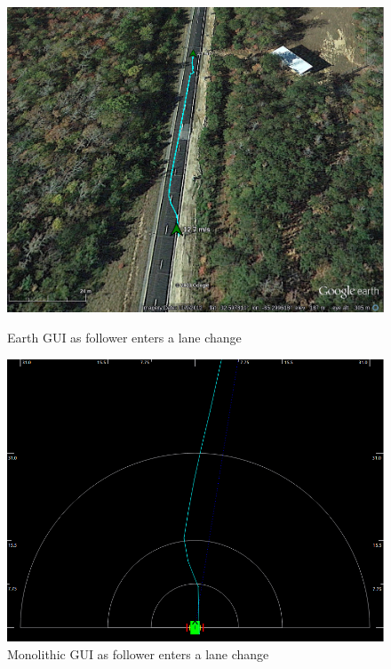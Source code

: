 \begin{figure}[ht] \centering
    \begin{minipage}[b]{0.45\linewidth} \centering 
        \includegraphics[width=\textwidth]{./figs/lane_change.png}
        \caption{Earth GUI as follower enters a lane change} \label{fig:lanechange_earth}
    \end{minipage}
    \hspace{0.5cm}
    \begin{minipage}[b]{0.45\linewidth} \centering
        \includegraphics[width=\textwidth]{./figs/lane_change_mono.png}
        \caption{Monolithic GUI as follower enters a lane change} \label{fig:lanechange_mono}
    \end{minipage}
\end{figure}



